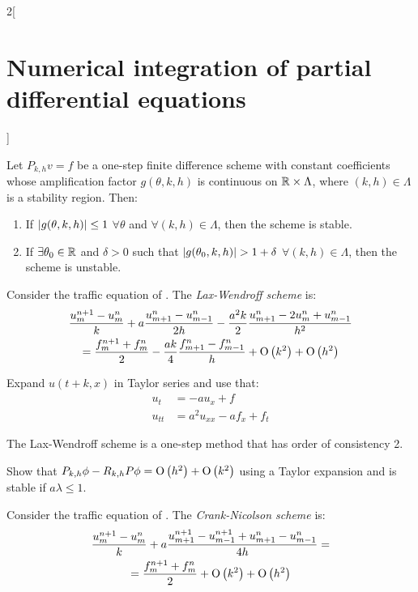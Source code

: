 \documentclass[../../../main_math.tex]{subfiles}
\begin{document}
\begin{multicols}{2}[\section{Numerical integration of partial differential equations}]
\begin{corollary}
    Let $P_{k,h}{v}={f}$ be a one-step finite difference scheme with constant coefficients whose amplification factor $g(\theta,k,h)$ is continuous on $\mathbb{R}\times\Lambda$, where $(k,h)\in\Lambda$ is a stability region. Then:
    \begin{enumerate}
      \item If $\abs{g(\theta,k,h)}\leq 1$ $\forall \theta$ and $\forall(k,h)\in\Lambda$, then the scheme is stable.
      \item If $\exists\theta_0\in\mathbb{R}$ and $\delta>0$ such that $\abs{g(\theta_0,k,h)}>1+\delta$ $\forall(k,h)\in\Lambda$, then the scheme is unstable.
    \end{enumerate}
  \end{corollary}
  \begin{proposition}
    Consider the traffic equation of .
    The \emph{Lax-Wendroff scheme} is:
    \begin{multline*}
      \frac{u_m^{n+1}-u_{m}^n}{k}+a\frac{u_{m+1}^{n}-u_{m-1}^n}{2h}-\frac{a^2k}{2}\frac{u_{m+1}^n-2u_m^n+u_{m-1}^n}{h^2} \\ =\frac{f_m^{n+1}+f_m^n}{2}-\frac{ak}{4}\frac{f_{m+1}^n-f_{m-1}^n}{h}+\mathrm{O}\left(k^2\right)+\mathrm{O}\left(h^2\right)
    \end{multline*}
  \end{proposition}
  \begin{sproof}
    Expand $u(t+k,x)$ in Taylor series and use that:
    \begin{align*}
      u_t    & =-au_x+f            \\
      u_{tt} & =a^2u_{xx}-af_x+f_t
    \end{align*}
  \end{sproof}
  \begin{proposition}
    The Lax-Wendroff scheme is a one-step method that has order of consistency 2.
  \end{proposition}
  \begin{sproof}
    Show that $P_{k,h}\phi-R_{k,h}P\phi=\mathrm{O}\left(h^2\right)+\mathrm{O}\left(k^2\right)$ using a Taylor expansion and is stable if $a\lambda\leq 1$.
  \end{sproof}
  \begin{proposition}
    Consider the traffic equation of .
    The \emph{Crank-Nicolson scheme} is:
    \begin{multline*}
      \frac{u_m^{n+1}-u_{m}^n}{k}+a\frac{u_{m+1}^{n+1}-u_{m-1}^{n+1}+u_{m+1}^{n}-u_{m-1}^{n}}{4h}=\\ =\frac{f_m^{n+1}+f_m^n}{2}+\O{k^2}+\O{h^2}

\end{multline*}
\end{proposition}
\end{multicols}
\end{document}
